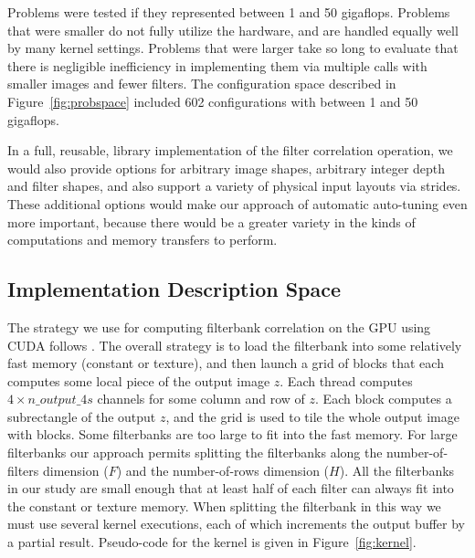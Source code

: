 \documentclass{sig-alternate}
\begin{document}
Problems were tested if they represented between 1 and 50 gigaflops.  Problems
that were smaller do not fully utilize the hardware, and are handled equally
well by many kernel settings.
Problems that were larger take so long to evaluate that there is negligible
inefficiency in implementing them via multiple calls with smaller images and fewer filters.
The configuration space described in Figure~\ref{fig:probspace} included 602
configurations with between 1 and 50 gigaflops.

In a full, reusable, library implementation of the filter correlation
operation, we would also provide options for arbitrary image shapes,
arbitrary integer depth and filter shapes, and also support a variety of
physical input layouts via strides.  These additional options would make our
approach of automatic auto-tuning even more important, because there would be
a greater variety in the kinds of computations and memory transfers to
perform.


\subsection{Implementation Description Space}

The strategy we use for computing filterbank correlation on the GPU
using CUDA follows \citet{pinto+cox:2011gcg}.
The overall strategy is to load the filterbank into some relatively fast
memory (constant or texture), and then launch a grid of blocks that each
computes some local piece of the output image $z$.
Each thread computes $4 \times n\_output\_4s$ channels for some column and row of $z$.
Each block computes a subrectangle of the output $z$,
and the grid is used to tile the whole output image with blocks.
Some filterbanks are too large to fit into the fast memory.
For large filterbanks our approach permits splitting the filterbanks along
the number-of-filters dimension ($F$) and the number-of-rows dimension ($H$).
All the filterbanks in our study are small enough that at least half of each
filter can always fit into the constant or texture memory.
When splitting the filterbank in this way we must use several kernel
executions, each of which increments the output buffer by a partial result.
Pseudo-code for the kernel is given in Figure~\ref{fig:kernel}.
\end{document}

